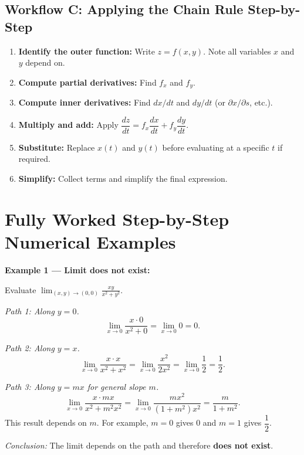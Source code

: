 \documentclass[12pt,a4paper]{article}
\begin{document}
\subsection*{Workflow C: Applying the Chain Rule Step-by-Step}

\begin{enumerate}
  \item \textbf{Identify the outer function:} Write \(z = f(x,y)\). Note all variables \(x\) and \(y\) depend on.
  \item \textbf{Compute partial derivatives:} Find \(f_x\) and \(f_y\).
  \item \textbf{Compute inner derivatives:} Find \(dx/dt\) and \(dy/dt\) (or \(\partial x/\partial s\), etc.).
  \item \textbf{Multiply and add:} Apply \(\dfrac{dz}{dt} = f_x \dfrac{dx}{dt} + f_y \dfrac{dy}{dt}\).
  \item \textbf{Substitute:} Replace \(x(t)\) and \(y(t)\) before evaluating at a specific \(t\) if required.
  \item \textbf{Simplify:} Collect terms and simplify the final expression.
\end{enumerate}

\section{Fully Worked Step-by-Step Numerical Examples}

\textbf{Example 1 --- Limit does not exist:}

Evaluate \(\displaystyle\lim_{(x,y)\to(0,0)} \frac{xy}{x^2+y^2}\).

\textit{Path 1: Along \(y=0\).}
\[
\lim_{x\to 0} \frac{x \cdot 0}{x^2 + 0} = \lim_{x\to 0} 0 = 0.
\]

\textit{Path 2: Along \(y=x\).}
\[
\lim_{x\to 0} \frac{x \cdot x}{x^2 + x^2} = \lim_{x\to 0} \frac{x^2}{2x^2} = \lim_{x\to 0} \frac{1}{2} = \frac{1}{2}.
\]

\textit{Path 3: Along \(y = mx\) for general slope \(m\).}
\[
\lim_{x\to 0} \frac{x \cdot mx}{x^2 + m^2 x^2} = \lim_{x\to 0} \frac{mx^2}{(1+m^2)x^2} = \frac{m}{1+m^2}.
\]
This result depends on \(m\). For example, \(m=0\) gives \(0\) and \(m=1\) gives \(\dfrac{1}{2}\).

\textit{Conclusion:} The limit depends on the path and therefore \textbf{does not exist}.

\bigskip
\end{document}
